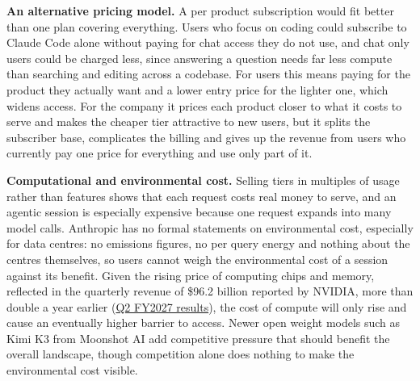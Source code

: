 \begin{answer}
  \medskip
  \textbf{An alternative pricing model.} A per product subscription would fit better than one plan
  covering everything. Users who focus on coding could subscribe to Claude Code alone without
  paying for chat access they do not use, and chat only users could be charged less, since
  answering a question needs far less compute than searching and editing across a codebase. For
  users this means paying for the product they actually want and a lower entry price for the
  lighter one, which widens access. For the company it prices each product closer to what it costs
  to serve and makes the cheaper tier attractive to new users, but it splits the subscriber base,
  complicates the billing and gives up the revenue from users who currently pay one price for
  everything and use only part of it.

  \medskip
  \textbf{Computational and environmental cost.} Selling tiers in multiples of usage rather than
  features shows that each request costs real money to serve, and an agentic session is especially
  expensive because one request expands into many model calls. Anthropic has no formal statements
  on environmental cost, especially for data centres: no emissions figures, no per query energy and
  nothing about the centres themselves, so users cannot weigh the environmental cost of a session
  against its benefit. Given the rising price of computing chips and memory, reflected in the
  quarterly revenue of \$96.2 billion reported by NVIDIA, more than double a year earlier
  (\href{https://nvidianews.nvidia.com/news/nvidia-announces-financial-results-for-second-quarter-fiscal-2027}{Q2 FY2027 results}),
  the cost of compute will only rise and cause an eventually higher barrier to access. Newer open
  weight models such as Kimi K3 from Moonshot AI add competitive pressure that should benefit the
  overall landscape, though competition alone does nothing to make the environmental cost
  visible.
\end{answer}
\clearpage

